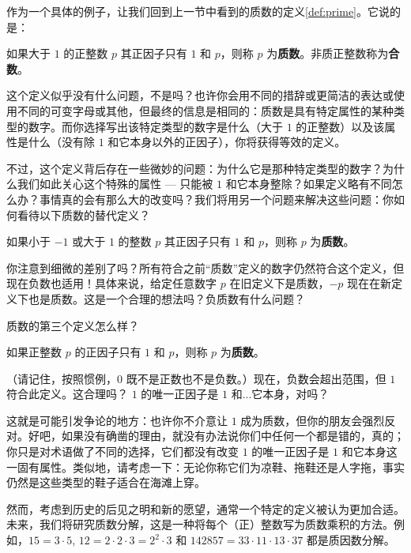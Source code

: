作为一个具体的例子，让我们回到上一节中看到的质数的定义\ref{def:prime}。它说的是：

\begin{definition}
    如果大于 $1$ 的正整数 $p$ 其正因子只有 $1$ 和 $p$，则称 $p$ 为\textbf{质数}。非质正整数称为\textbf{合数}。
\end{definition}

这个定义似乎没有什么问题，不是吗？也许你会用不同的措辞或更简洁的表达或使用不同的可变字母或其他，但最终的信息是相同的：质数是具有特定属性的某种类型的数字。而你选择写出该特定类型的数字是什么（大于 $1$ 的正整数）以及该属性是什么（没有除 $1$ 和它本身以外的正因子），你将获得等效的定义。

不过，这个定义背后存在一些微妙的问题：为什么它是那种特定类型的数字？为什么我们如此关心这个特殊的属性 --- 只能被 $1$ 和它本身整除？如果定义略有不同怎么办？事情真的会有那么大的改变吗？我们将用另一个问题来解决这些问题：你如何看待以下质数的替代定义？

\begin{definition}\label{def:prime2}
    如果小于 $-1$ 或大于 $1$ 的整数 $p$ 其正因子只有 $1$ 和 $p$，则称 $p$ 为\textbf{质数}。
\end{definition}

你注意到细微的差别了吗？所有符合之前“质数”定义的数字仍然符合这个定义，但现在负数也适用！具体来说，给定任意数字 $p$ 在旧定义下是质数，$-p$ 现在在新定义下也是质数。这是一个合理的想法吗？负质数有什么问题？

质数的第三个定义怎么样？

\begin{definition}\label{def:prime3}
    如果正整数 $p$ 的正因子只有 $1$ 和 $p$，则称 $p$ 为\textbf{质数}。
\end{definition}

（请记住，按照惯例，$0$ 既不是正数也不是负数。）现在，负数会超出范围，但 $1$ 符合此定义。这合理吗？ $1$ 的唯一正因子是 $1$ 和...它本身，对吗？

这就是可能引发争论的地方：也许你不介意让 $1$ 成为质数，但你的朋友会强烈反对。好吧，如果没有确凿的理由，就没有办法说你们中任何一个都是错的，真的；你只是对术语做了不同的选择，它们都没有改变 $1$ 的唯一正因子是 $1$ 和它本身这一固有属性。类似地，请考虑一下：无论你称它们为凉鞋、拖鞋还是人字拖，事实仍然是这些类型的鞋子适合在海滩上穿。

然而，考虑到历史的后见之明和新的愿望，通常一个特定的定义被认为更加合适。未来，我们将研究质数分解，这是一种将每个（正）整数写为质数乘积的方法。例如，$15 = 3 \cdot 5$, $12 = 2 \cdot 2 \cdot 3 = 2^2 \cdot 3$ 和 $142857 = 33 \cdot 11 \cdot 13 \cdot 37$ 都是质因数分解。

